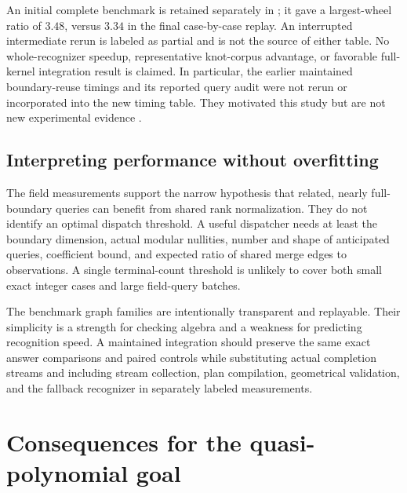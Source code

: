 \documentclass[11pt,letterpaper]{article}
\theoremstyle{definition}\newtheorem{definition}[theorem]{Definition}
\theoremstyle{remark}\newtheorem{remark}[theorem]{Remark}
\newcommand{\code}[1]{\texttt{\detokenize{#1}}}
\begin{document}
An initial complete benchmark is retained separately in \code{results/benchmark_initial.json}; it gave a largest-wheel ratio of $3.48$, versus $3.34$ in the final case-by-case replay. An interrupted intermediate rerun is labeled as partial and is not the source of either table. No whole-recognizer speedup, representative knot-corpus advantage, or favorable full-kernel integration result is claimed. In particular, the earlier maintained boundary-reuse timings and its reported query audit were not rerun or incorporated into the new timing table. They motivated this study but are not new experimental evidence \cite{boundary}.

\subsection{Interpreting performance without overfitting}
The field measurements support the narrow hypothesis that related, nearly full-boundary queries can benefit from shared rank normalization. They do not identify an optimal dispatch threshold. A useful dispatcher needs at least the boundary dimension, actual modular nullities, number and shape of anticipated queries, coefficient bound, and expected ratio of shared merge edges to observations. A single terminal-count threshold is unlikely to cover both small exact integer cases and large field-query batches.

The benchmark graph families are intentionally transparent and replayable. Their simplicity is a strength for checking algebra and a weakness for predicting recognition speed. A maintained integration should preserve the same exact answer comparisons and paired controls while substituting actual completion streams and including stream collection, plan compilation, geometrical validation, and the fallback recognizer in separately labeled measurements.

\section{Consequences for the quasi-polynomial goal}
\label{sec:qp}
\end{document}
